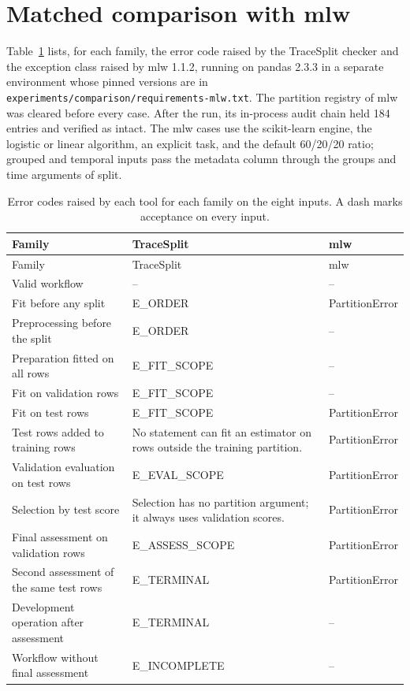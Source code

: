 \documentclass[11pt,letterpaper]{article}
\begin{document}
\section{Matched comparison with mlw}
Table~\ref{tab:comparisonerrors} lists, for each family, the error code raised by the TraceSplit checker and the exception class raised by mlw 1.1.2, running on pandas 2.3.3 in a separate environment whose pinned versions are in \texttt{experiments/comparison/requirements-mlw.txt}. The partition registry of mlw was cleared before every case. After the run, its in-process audit chain held 184 entries and verified as intact. The mlw cases use the scikit-learn engine, the logistic or linear algorithm, an explicit task, and the default 60/20/20 ratio; grouped and temporal inputs pass the metadata column through the groups and time arguments of split.

\begin{longtable}{p{}p{}p{}}
\caption{Error codes raised by each tool for each family on the eight inputs. A dash marks acceptance on every input.}\label{tab:comparisonerrors}\\
\toprule Family & TraceSplit & mlw\\\midrule\endfirsthead
\toprule Family & TraceSplit & mlw\\\midrule\endhead
Valid workflow & -- & --\\
Fit before any split & E\_ORDER & PartitionError\\
Preprocessing before the split & E\_ORDER & --\\
Preparation fitted on all rows & E\_FIT\_SCOPE & --\\
Fit on validation rows & E\_FIT\_SCOPE & --\\
Fit on test rows & E\_FIT\_SCOPE & PartitionError\\
Test rows added to training rows & No statement can fit an estimator on rows outside the training partition. & PartitionError\\
Validation evaluation on test rows & E\_EVAL\_SCOPE & PartitionError\\
Selection by test score & Selection has no partition argument; it always uses validation scores. & PartitionError\\
Final assessment on validation rows & E\_ASSESS\_SCOPE & PartitionError\\
Second assessment of the same test rows & E\_TERMINAL & PartitionError\\
Development operation after assessment & E\_TERMINAL & --\\
Workflow without final assessment & E\_INCOMPLETE & --\\
\bottomrule
\end{longtable}
\end{document}
